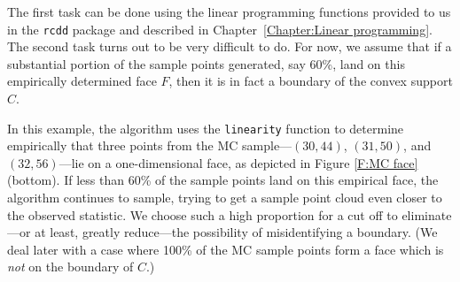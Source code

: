 The first task can be done using the linear programming functions provided to us in 
the \texttt{rcdd} package and described in Chapter~\ref{Chapter:Linear programming}.  The second task turns out to be very difficult to do.  
For now, we assume that if a substantial portion of the sample points generated, say 
60\%, land on this empirically determined face $F$, then it is in fact a boundary of 
the convex support $C$.  


In this example, the algorithm uses the \texttt{linearity} function to determine empirically that three points from the MC sample---$(30,44)$, $(31,50)$, 
and $(32,56)$---lie on a one-dimensional face, as depicted in Figure \ref{F:MC face} 
(bottom).  If less than 60\% of the sample points land on this empirical face, the 
algorithm continues to sample, trying to get a sample point cloud even closer to the 
observed statistic.  We choose such a high proportion for a cut off to eliminate---or 
at least, greatly reduce---the possibility of misidentifying a boundary.
(We deal later with a case where 100\% of the MC sample points form a face which is 
\emph{not} on the boundary of $C$.)
